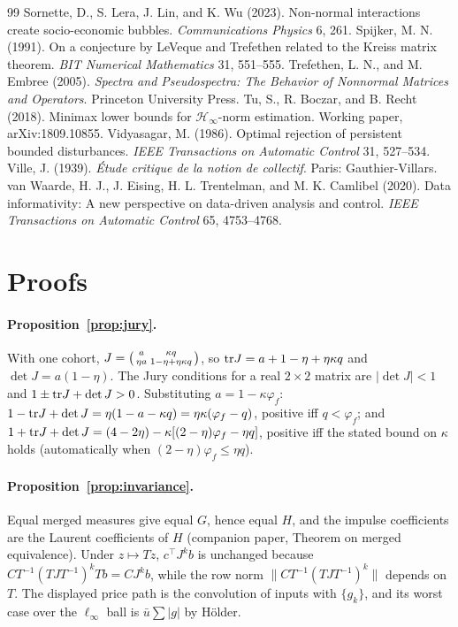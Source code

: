 \begin{thebibliography}{99}
 Sornette, D., S. Lera, J. Lin, and K. Wu (2023). Non-normal interactions create socio-economic bubbles. \emph{Communications Physics} 6, 261.
 Spijker, M. N. (1991). On a conjecture by LeVeque and Trefethen related to the Kreiss matrix theorem. \emph{BIT Numerical Mathematics} 31, 551--555.
 Trefethen, L. N., and M. Embree (2005). \emph{Spectra and Pseudospectra: The Behavior of Nonnormal Matrices and Operators}. Princeton University Press.
 Tu, S., R. Boczar, and B. Recht (2018). Minimax lower bounds for $\mathcal H_\infty$-norm estimation. Working paper, arXiv:1809.10855.
 Vidyasagar, M. (1986). Optimal rejection of persistent bounded disturbances. \emph{IEEE Transactions on Automatic Control} 31, 527--534.
 Ville, J. (1939). \emph{\'Etude critique de la notion de collectif}. Paris: Gauthier-Villars.
 van Waarde, H. J., J. Eising, H. L. Trentelman, and M. K. Camlibel (2020). Data informativity: A new perspective on data-driven analysis and control. \emph{IEEE Transactions on Automatic Control} 65, 4753--4768.
\end{thebibliography}

\appendix
\section{Proofs}\label{app:proofs}

\paragraph{Proposition~\ref{prop:jury}.} With one cohort, $J=\begin{psmallmatrix}a&\kappa q\\ \eta a&1-\eta+\eta\kappa q\end{psmallmatrix}$, so ${\rm tr}J=a+1-\eta+\eta\kappa q$ and $\det J=a(1-\eta)$. The Jury conditions for a real $2\times2$ matrix are $|\det J|<1$ and $1\pm{\rm tr}J+\det J>0$. Substituting $a=1-\kappa\varphi_f$: $1-{\rm tr}J+\det J=\eta(1-a-\kappa q)=\eta\kappa(\varphi_f-q)$, positive iff $q<\varphi_f$; and $1+{\rm tr}J+\det J=(4-2\eta)-\kappa[(2-\eta)\varphi_f-\eta q]$, positive iff the stated bound on $\kappa$ holds (automatically when $(2-\eta)\varphi_f\le\eta q$).

\paragraph{Proposition~\ref{prop:invariance}.} Equal merged measures give equal $G$, hence equal $H$, and the impulse coefficients are the Laurent coefficients of $H$ (companion paper, Theorem on merged equivalence). Under $z\mapsto Tz$, $c^\top J^kb$ is unchanged because $CT^{-1}(TJT^{-1})^kTb=CJ^kb$, while the row norm $\|CT^{-1}(TJT^{-1})^k\|$ depends on $T$. The displayed price path is the convolution of inputs with $\{g_k\}$, and its worst case over the $\ell_\infty$ ball is $\bar u\sum|g|$ by H\"older.

